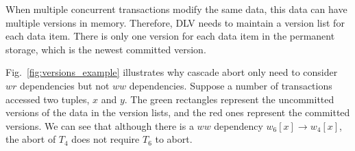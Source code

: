 \documentclass[conference]{IEEEtran}
\begin{document}
When multiple concurrent transactions modify the same data, this data can have multiple versions in memory.
Therefore, DLV needs to maintain a version list for each data item.
There is only one version for each data item in the permanent storage, which is the newest committed version.

Fig.~\ref{fig:versions_example} illustrates why cascade abort only need to consider $wr$ dependencies but not $ww$ dependencies. %
Suppose a number of transactions accessed two tuples, ${x}$ and ${y}$.
The green rectangles represent the uncommitted versions of the data in the version lists, and the red ones represent the committed versions.
We can see that although there is a ${ww}$ dependency ${w_6[x] \rightarrow w_4[x]}$,
the abort of $T_4$ does not require ${T_6}$ to abort.
\end{document}

